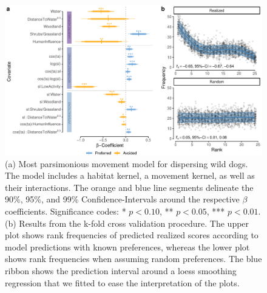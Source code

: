 \documentclass[abstract=on,10pt,a4paper,bibliography=totocnumbered]{article}
\begin{document}
\begin{figure}
  \begin{center}
    \includegraphics[width=\textwidth]{99_MovementModel}
    \caption{(a) Most parsimonious movement model for dispersing wild dogs. The
    model includes a habitat kernel, a movement kernel, as well as their
    interactions. The orange and blue line segments delineate the 90\%, 95\%,
    and 99\% Confidence-Intervals around the respective \(\beta\) coefficients.
    Significance codes: * \(p < 0.10\), ** \(p < 0.05\), *** \(p < 0.01\). (b)
    Results from the k-fold cross validation procedure. The upper plot shows
    rank frequencies of predicted realized scores according to model predictions
    with known preferences, whereas the lower plot shows rank frequencies when
    assuming random preferences. The blue ribbon shows the prediction interval
    around a loess smoothing regression that we fitted to ease the
    interpretation of the plots.}
    \label{MovementModel}
  \end{center}
\end{figure}
\end{document}
